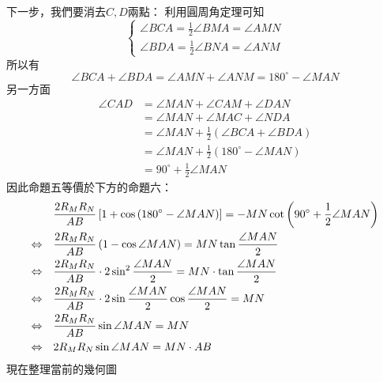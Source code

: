 \documentclass{article}
\begin{document}
下一步，我們要消去$C,D$兩點：
利用圓周角定理可知
$$
\begin{cases}
  \angle{BCA}=\frac{1}{2}\angle{BMA}=\angle{AMN}\\ 
  \angle{BDA}=\frac{1}{2}\angle{BNA}=\angle{ANM}
\end{cases}
$$
所以有
$$
\angle{BCA}+\angle{BDA}=\angle{AMN}+\angle{ANM}=180^{\circ}-\angle{MAN}
$$
另一方面
\begin{align*}
  \angle{CAD}&=\angle{MAN}+\angle{CAM}+\angle{DAN}\\
  &=\angle{MAN}+\angle{MAC}+\angle{NDA}\\
  &=\angle{MAN}+\frac{1}{2}\left(\angle{BCA}+\angle{BDA}\right)\\
  &=\angle{MAN}+\frac{1}{2}\left(180^{\circ}-\angle{MAN}\right)\\
  &=90^{\circ}+\frac{1}{2}\angle{MAN}
\end{align*}
因此命題五等價於下方的命題六：
\begin{align}
  &\frac{2R_MR_N}{AB}\left[1+\cos{\left(180^{\circ}-\angle{MAN}\right)}\right]
  =-MN\cot{\left(90^{\circ}+\frac{1}{2}\angle{MAN}\right)}\notag\\
  \Leftrightarrow\quad&\frac{2R_MR_N}{AB}\left(1-\cos{\angle{MAN}}\right)
  =MN\tan{\frac{\angle{MAN}}{2}}\notag\\
  \Leftrightarrow\quad&\frac{2R_MR_N}{AB}\cdot2\sin^2{\frac{\angle{MAN}}{2}}=MN\cdot\tan{\frac{\angle{MAN}}{2}}\notag\\
  \Leftrightarrow\quad&\frac{2R_MR_N}{AB}\cdot2\sin{\frac{\angle{MAN}}{2}}\cos{\frac{\angle{MAN}}{2}}=MN\notag\\
  \Leftrightarrow\quad&\frac{2R_MR_N}{AB}\sin{\angle{MAN}}=MN\notag\\
  \Leftrightarrow\quad&2R_MR_N\sin{\angle{MAN}}=MN\cdot AB
\end{align}
現在整理當前的幾何圖
\begin{center} %
\end{center}
\end{document}
